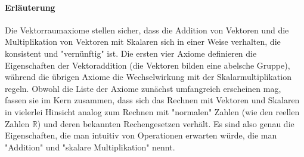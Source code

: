 \paragraph{Erläuterung}
Die Vektorraumaxiome stellen sicher, dass die Addition von Vektoren und die Multiplikation von Vektoren mit Skalaren sich in einer Weise verhalten, die konsistent und "vernünftig" ist. Die ersten vier Axiome definieren die Eigenschaften der Vektoraddition (die Vektoren bilden eine abelsche Gruppe), während die übrigen Axiome die Wechselwirkung mit der Skalarmultiplikation regeln. Obwohl die Liste der Axiome zunächst umfangreich erscheinen mag, fassen sie im Kern zusammen, dass sich das Rechnen mit Vektoren und Skalaren in vielerlei Hinsicht analog zum Rechnen mit "normalen" Zahlen (wie den reellen Zahlen $\mathbb{R}$) und deren bekannten Rechengesetzen verhält. Es sind also genau die Eigenschaften, die man intuitiv von Operationen erwarten würde, die man "Addition" und "skalare Multiplikation" nennt.
